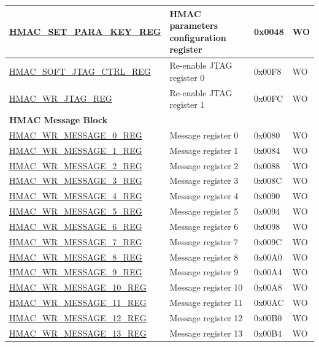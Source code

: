\begin{longtable}{ | p{6cm} | p{7.2cm} | p{1.3cm} | p{1cm} | }
\hyperref[regdesc:HMACSETPARAKEYREG]{HMAC\_SET\_PARA\_KEY\_REG} & HMAC parameters configuration register & 0x0048 & WO \\ \hline
\hyperref[regdesc:HMACSOFTJTAGCTRLREG]{HMAC\_SOFT\_JTAG\_CTRL\_REG} & Re-enable JTAG register 0 & 0x00F8 & WO \\ \hline
\hyperref[regdesc:HMACWRJTAGREG]{HMAC\_WR\_JTAG\_REG} & Re-enable JTAG register 1 & 0x00FC & WO \\ \hline
\multicolumn{4}{|l|}{\textbf{HMAC Message Block}} \\ \hline
\hyperref[regdesc:HMACWRMESSAGENREG]{HMAC\_WR\_MESSAGE\_0\_REG} & Message register 0 & 0x0080 & WO \\ \hline
\hyperref[regdesc:HMACWRMESSAGENREG]{HMAC\_WR\_MESSAGE\_1\_REG} & Message register 1 & 0x0084 & WO \\ \hline
\hyperref[regdesc:HMACWRMESSAGENREG]{HMAC\_WR\_MESSAGE\_2\_REG} & Message register 2 & 0x0088 & WO \\ \hline
\hyperref[regdesc:HMACWRMESSAGENREG]{HMAC\_WR\_MESSAGE\_3\_REG} & Message register 3 & 0x008C & WO \\ \hline
\hyperref[regdesc:HMACWRMESSAGENREG]{HMAC\_WR\_MESSAGE\_4\_REG} & Message register 4 & 0x0090 & WO \\ \hline
\hyperref[regdesc:HMACWRMESSAGENREG]{HMAC\_WR\_MESSAGE\_5\_REG} & Message register 5 & 0x0094 & WO \\ \hline
\hyperref[regdesc:HMACWRMESSAGENREG]{HMAC\_WR\_MESSAGE\_6\_REG} & Message register 6 & 0x0098 & WO \\ \hline
\hyperref[regdesc:HMACWRMESSAGENREG]{HMAC\_WR\_MESSAGE\_7\_REG} & Message register 7 & 0x009C & WO \\ \hline
\hyperref[regdesc:HMACWRMESSAGENREG]{HMAC\_WR\_MESSAGE\_8\_REG} & Message register 8 & 0x00A0 & WO \\ \hline
\hyperref[regdesc:HMACWRMESSAGENREG]{HMAC\_WR\_MESSAGE\_9\_REG} & Message register 9 & 0x00A4 & WO \\ \hline
\hyperref[regdesc:HMACWRMESSAGENREG]{HMAC\_WR\_MESSAGE\_10\_REG} & Message register 10 & 0x00A8 & WO \\ \hline
\hyperref[regdesc:HMACWRMESSAGENREG]{HMAC\_WR\_MESSAGE\_11\_REG} & Message register 11 & 0x00AC & WO \\ \hline
\hyperref[regdesc:HMACWRMESSAGENREG]{HMAC\_WR\_MESSAGE\_12\_REG} & Message register 12 & 0x00B0 & WO \\ \hline
\hyperref[regdesc:HMACWRMESSAGENREG]{HMAC\_WR\_MESSAGE\_13\_REG} & Message register 13 & 0x00B4 & WO \\ \hline

\end{longtable}
